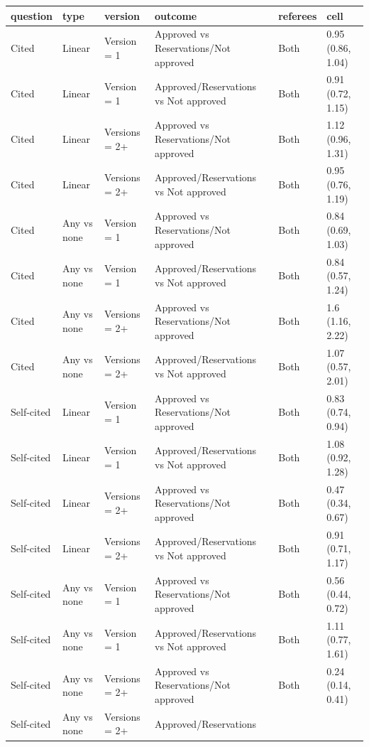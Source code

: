 \begin{table}[ht]
\centering
\begin{tabular}{llllll}
 question & type & version & outcome & referees & cell \\ 
  \hline
Cited & Linear & Version = 1 & Approved vs
Reservations/Not approved & Both & 0.95 (0.86, 1.04) \\ 
  Cited & Linear & Version = 1 & Approved/Reservations
vs Not approved & Both & 0.91 (0.72, 1.15) \\ 
  Cited & Linear & Versions = 2+ & Approved vs
Reservations/Not approved & Both & 1.12 (0.96, 1.31) \\ 
  Cited & Linear & Versions = 2+ & Approved/Reservations
vs Not approved & Both & 0.95 (0.76, 1.19) \\ 
  Cited & Any vs none & Version = 1 & Approved vs
Reservations/Not approved & Both & 0.84 (0.69, 1.03) \\ 
  Cited & Any vs none & Version = 1 & Approved/Reservations
vs Not approved & Both & 0.84 (0.57, 1.24) \\ 
  Cited & Any vs none & Versions = 2+ & Approved vs
Reservations/Not approved & Both & 1.6 (1.16, 2.22) \\ 
  Cited & Any vs none & Versions = 2+ & Approved/Reservations
vs Not approved & Both & 1.07 (0.57, 2.01) \\ 
  Self-cited & Linear & Version = 1 & Approved vs
Reservations/Not approved & Both & 0.83 (0.74, 0.94) \\ 
  Self-cited & Linear & Version = 1 & Approved/Reservations
vs Not approved & Both & 1.08 (0.92, 1.28) \\ 
  Self-cited & Linear & Versions = 2+ & Approved vs
Reservations/Not approved & Both & 0.47 (0.34, 0.67) \\ 
  Self-cited & Linear & Versions = 2+ & Approved/Reservations
vs Not approved & Both & 0.91 (0.71, 1.17) \\ 
  Self-cited & Any vs none & Version = 1 & Approved vs
Reservations/Not approved & Both & 0.56 (0.44, 0.72) \\ 
  Self-cited & Any vs none & Version = 1 & Approved/Reservations
vs Not approved & Both & 1.11 (0.77, 1.61) \\ 
  Self-cited & Any vs none & Versions = 2+ & Approved vs
Reservations/Not approved & Both & 0.24 (0.14, 0.41) \\ 
  Self-cited & Any vs none & Versions = 2+ & Approved/Reservations

\end{tabular}
\end{table}
